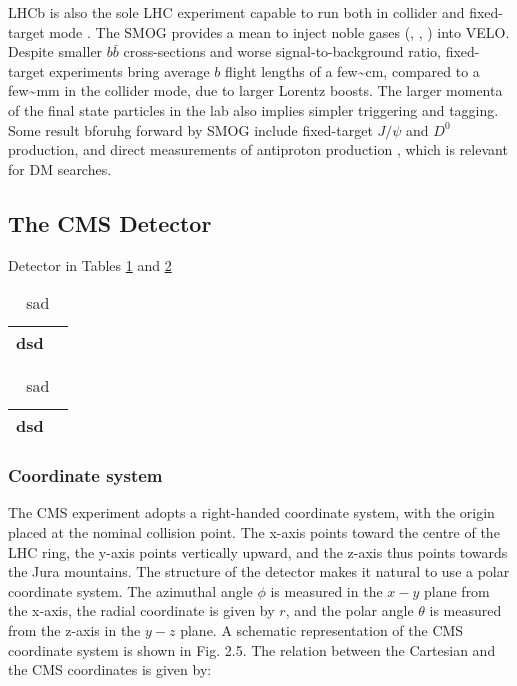 \documentclass[11pt]{article}
\newcommand{\bb}{$b\bar{b}$}
\newcommand{\jpsi}{$J/\psi$}
\begin{document}
\ac{LHCb} is also the sole \ac{LHC} experiment capable to run both in collider and fixed-target mode \cite{lhcb_fixed_target}.
The \ac{SMOG} provides a mean to inject noble gases (, , ) into \ac{VELO}.
Despite smaller \bb{} cross-sections and worse signal-to-background ratio, fixed-target experiments bring average \(b\) flight lengths of a few\textasciitilde{}\si{\cm}, compared to a few\textasciitilde{}\si{\mm} in the collider mode, due to larger Lorentz boosts.
The larger momenta of the final state particles in the lab also implies simpler triggering and tagging.
Some result bforuhg forward by \ac{SMOG} include fixed-target \jpsi{} and \(D^{0}\) production, and direct measurements of antiproton production \cite{antimatter_prod_fixed_target_lhcb}, which is relevant for \ac{DM} searches.


\cite{bb_pairs1,bbpairs2}
\subsection{The CMS Detector}
\label{sec:org58790ae}
\label{sec:cms_detector}

Detector in Tables \cref{tab_sad} and \cref{tab_sad2}

\begin{table}[htbp]
\centering
\begin{tabular}{ll}
dsd & \\[0pt]
\hline
\end{tabular}
\caption{\label{tab_sad}sad}

\end{table}

\begin{table}[htbp]
\centering
\begin{tabular}{ll}
dsd & \\[0pt]
\hline
\end{tabular}
\caption{\label{tab_sad2}sad}

\end{table}
\subsubsection{Coordinate system}
\label{sec:org8364201}
The CMS experiment adopts a right-handed coordinate system, with the origin placed at the nominal collision point.
The x-axis points toward the centre of the LHC ring, the y-axis points vertically upward, and the z-axis thus points towards the Jura mountains.
The structure of the detector makes it natural to use a polar coordinate system.
The azimuthal angle \(\phi\) is measured in the \(x - y\) plane from the x-axis, the radial coordinate is given by \(r\), and the polar angle \(\theta\) is measured from the z-axis in the \(y - z\) plane.
A schematic representation of the CMS coordinate system is shown in Fig. 2.5.
The relation between the Cartesian and the CMS coordinates is given by:
\end{document}
